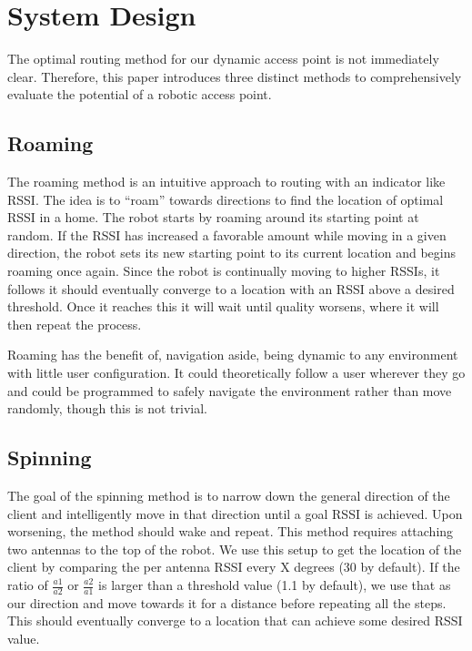   

\section{System Design}

The optimal routing method for our dynamic access point is not immediately clear. Therefore, this paper introduces three distinct methods to comprehensively evaluate the potential of a robotic access point.

  

\subsection{Roaming}

The roaming method is an intuitive approach to routing with an indicator like RSSI. The idea is to “roam” towards directions to find the location of optimal RSSI in a home. The robot starts by roaming around its starting point at random. If the RSSI has increased a favorable amount while moving in a given direction, the robot sets its new starting point to its current location and begins roaming once again. Since the robot is continually moving to higher RSSIs, it follows it should eventually converge to a location with an RSSI above a desired threshold. Once it reaches this it will wait until quality worsens, where it will then repeat the process.\par

  

Roaming has the benefit of, navigation aside, being dynamic to any environment with little user configuration. It could theoretically follow a user wherever they go and could be programmed to safely navigate the environment rather than move randomly, though this is not trivial.

  

\subsection{Spinning}

The goal of the spinning method is to narrow down the general direction of the client and intelligently move in that direction until a goal RSSI is achieved. Upon worsening, the method should wake and repeat. This method requires attaching two antennas to the top of the robot. We use this setup to get the location of the client by comparing the per antenna RSSI every X degrees (30 by default). If the ratio of \(\frac{a1}{a2}\) or \(\frac{a2}{a1}\) is larger than a threshold value (1.1 by default), we use that as our direction and move towards it for a distance before repeating all the steps. This should eventually converge to a location that can achieve some desired RSSI value.

